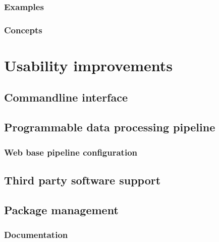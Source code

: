 \hypertarget{examples}{%
\subsection{Examples}\label{examples}}

\hypertarget{concepts-1}{%
\subsection{Concepts}\label{concepts-1}}

\hypertarget{usability-improvements}{%
\chapter{Usability improvements}\label{usability-improvements}}

\hypertarget{commandline-interface}{%
\section{Commandline interface}\label{commandline-interface}}

\hypertarget{programmable-data-processing-pipeline}{%
\section{Programmable data processing
pipeline}\label{programmable-data-processing-pipeline}}

\hypertarget{web-base-pipeline-configuration}{%
\subsection{Web base pipeline
configuration}\label{web-base-pipeline-configuration}}

\hypertarget{third-party-software-support}{%
\section{Third party software
support}\label{third-party-software-support}}

\hypertarget{package-management}{%
\section{Package management}\label{package-management}}

\hypertarget{documentation}{%
\subsection{Documentation}\label{documentation}}

